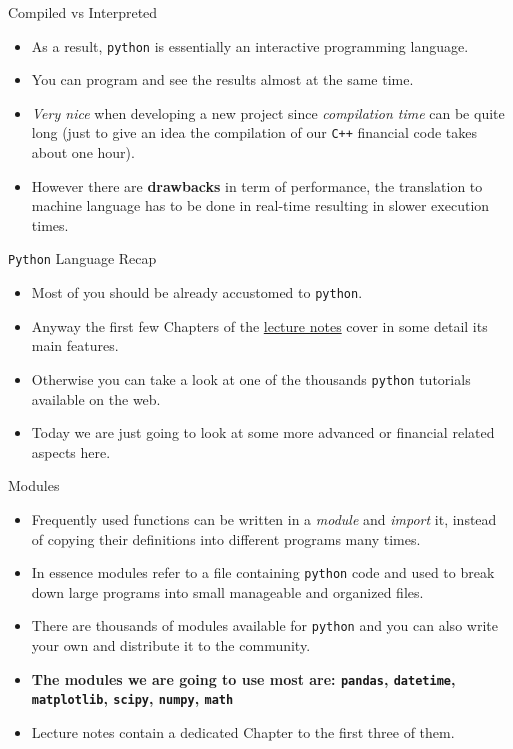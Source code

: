 \documentclass{beamer}
\begin{document}
\begin{frame}{Compiled vs Interpreted}
  \begin{itemize}
  \item As a result, \texttt{python} is essentially an interactive programming language.
  \item You can program and see the results almost at the same time. 
  \item \emph{Very nice} when developing a new project since \emph{compilation time} can be quite long (just to give an idea the compilation of our \texttt{C++} financial code takes about one hour). 
  \item However there are \textbf{drawbacks} in term of performance, the translation to machine language has to be done in real-time resulting in slower execution times.
  \end{itemize}
\end{frame}

\begin{frame}{\texttt{Python} Language Recap}
  \begin{itemize}
    \item Most of you should be already accustomed to \texttt{python}.
    \item Anyway the first few Chapters of the \href{https://drive.google.com/file/d/1GnlyuB4KkUbzqL7tf6nju-ZEqnfQrRa4/view?usp=drive_link}{lecture notes} cover in some detail its main features.
    \item Otherwise you can take a look at one of the thousands \texttt{python} tutorials available on the web.
    \item Today we are just going to look at some more advanced or financial related aspects here.
  \end{itemize}
\end{frame}

\begin{frame}[fragile]{Modules}
  \begin{itemize}
  \item Frequently used functions can be written in a \emph{module} and \emph{import} it, instead of copying their definitions into different programs many times.
  \item In essence modules refer to a file containing \texttt{python} code and used to break down large programs into small manageable and organized files. 
  \item There are thousands of modules available for \texttt{python} and you can also write your own and distribute it to the community.
  \item \textbf{The modules we are going to use most are: \texttt{pandas}, \texttt{datetime}, \texttt{matplotlib}, \texttt{scipy}, \texttt{numpy}, \texttt{math}}
  \item  Lecture notes contain a dedicated Chapter to the first three of them.
  \end{itemize}
\end{frame}
\end{document}
